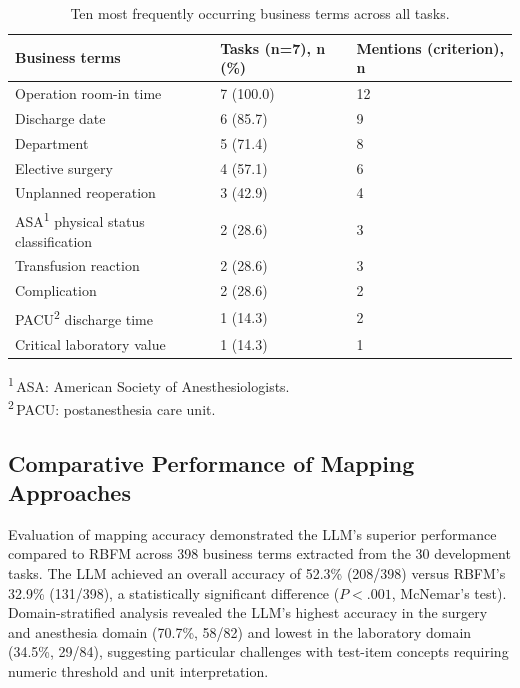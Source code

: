 \documentclass[applsci,article,submit,pdftex,oneauthor]{Definitions/mdpi}
\newcommand{\tnote}[1]{\textsuperscript{#1}}
\newcommand{\tabfoot}[1]{\par\vspace{2pt}\begingroup\raggedright\footnotesize
  \noindent #1\par\endgroup}
\newcommand{\tnotedef}[1]{\textsuperscript{#1}\,}
\begin{document}
\begin{table}[H]
\caption{Ten most frequently occurring business terms across all tasks.}
\label{tab:terms}
\centering
\footnotesize
\begin{tabular*}{\linewidth}{@{\extracolsep{\fill}}lll@{}}
\toprule
Business terms & Tasks (n=7), n (\%) & Mentions (criterion), n\\
\midrule
Operation room-in time                 & 7 (100.0) & 12\\
Discharge date                         & 6 (85.7)  & 9\\
Department                             & 5 (71.4)  & 8\\
Elective surgery                       & 4 (57.1)  & 6\\
Unplanned reoperation                  & 3 (42.9)  & 4\\
ASA\tnote{1} physical status classification & 2 (28.6) & 3\\
Transfusion reaction                   & 2 (28.6)  & 3\\
Complication                           & 2 (28.6)  & 2\\
PACU\tnote{2} discharge time           & 1 (14.3)  & 2\\
Critical laboratory value              & 1 (14.3)  & 1\\
\bottomrule
\end{tabular*}
\tabfoot{\tnotedef{1}ASA: American Society of Anesthesiologists.\\
\tnotedef{2}PACU: postanesthesia care unit.}
\end{table}

\subsection{Comparative Performance of Mapping Approaches}
Evaluation of mapping accuracy demonstrated the LLM's superior performance
compared to RBFM across 398 business terms extracted from the 30 development
tasks. The LLM achieved an overall accuracy of 52.3\% (208/398) versus RBFM's 32.9\% (131/398), a statistically significant difference ($P<.001$, McNemar's
test). Domain-stratified analysis revealed the LLM's highest accuracy in the
surgery and anesthesia domain (70.7\%, 58/82) and lowest in the laboratory domain (34.5\%, 29/84), suggesting particular challenges with test-item concepts
requiring numeric threshold and unit interpretation.
\end{document}
